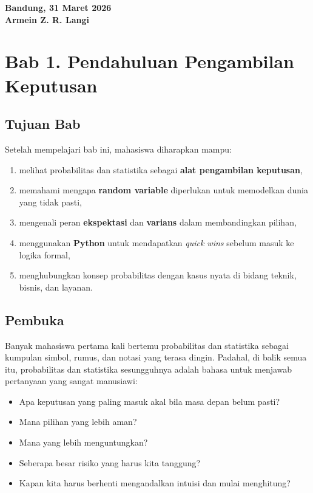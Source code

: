 \documentclass[
  letterpaper,
  DIV=11,
  numbers=noendperiod]{scrreprt}
\providecommand{\tightlist}{%
  \setlength{\itemsep}{0pt}\setlength{\parskip}{0pt}}
\begin{document}
\textbf{Bandung, 31 Maret 2026}\\
\textbf{Armein Z. R. Langi}


\chapter{Bab 1. Pendahuluan Pengambilan
Keputusan}\label{bab-1.-pendahuluan-pengambilan-keputusan}

\section{Tujuan Bab}\label{tujuan-bab}

Setelah mempelajari bab ini, mahasiswa diharapkan mampu:

\begin{enumerate}
\def\labelenumi{\arabic{enumi}.}
\tightlist
\item
  melihat probabilitas dan statistika sebagai \textbf{alat pengambilan
  keputusan},
\item
  memahami mengapa \textbf{random variable} diperlukan untuk memodelkan
  dunia yang tidak pasti,
\item
  mengenali peran \textbf{ekspektasi} dan \textbf{varians} dalam
  membandingkan pilihan,
\item
  menggunakan \textbf{Python} untuk mendapatkan \emph{quick wins}
  sebelum masuk ke logika formal,
\item
  menghubungkan konsep probabilitas dengan kasus nyata di bidang teknik,
  bisnis, dan layanan.
\end{enumerate}

\section{Pembuka}\label{pembuka}

Banyak mahasiswa pertama kali bertemu probabilitas dan statistika
sebagai kumpulan simbol, rumus, dan notasi yang terasa dingin. Padahal,
di balik semua itu, probabilitas dan statistika sesungguhnya adalah
bahasa untuk menjawab pertanyaan yang sangat manusiawi:

\begin{itemize}
\tightlist
\item
  Apa keputusan yang paling masuk akal bila masa depan belum pasti?
\item
  Mana pilihan yang lebih aman?
\item
  Mana yang lebih menguntungkan?
\item
  Seberapa besar risiko yang harus kita tanggung?
\item
  Kapan kita harus berhenti mengandalkan intuisi dan mulai menghitung?
\end{itemize}
\end{document}
